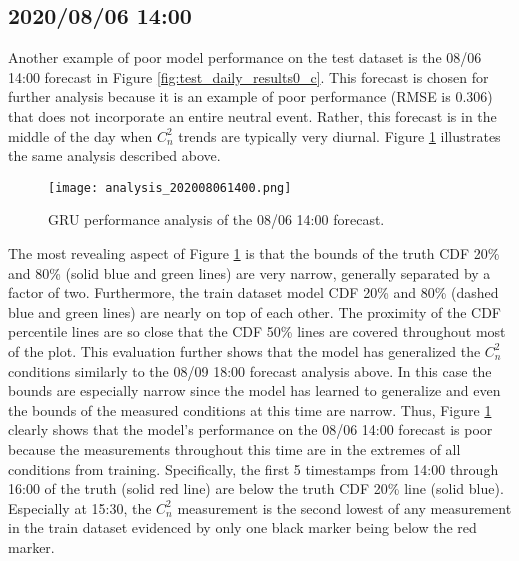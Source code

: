 \subsection{2020/08/06 14:00}
Another example of poor model performance on the test dataset is the 08/06 14:00 forecast in Figure \ref{fig:test_daily_results0_c}. This forecast is chosen for further analysis because it is an example of poor performance (RMSE is 0.306) that does not incorporate an entire neutral event. Rather, this forecast is in the middle of the day when $C_{n}^{2}$ trends are typically very diurnal. Figure \ref{fig:analysis_08061400} illustrates the same analysis described above.
\begin{figure}[h!]
	\centering
	\texttt{[image: analysis\_202008061400.png]}
	\caption{GRU performance analysis of the 08/06 14:00 forecast.}
	\label{fig:analysis_08061400}
\end{figure}
The most revealing aspect of Figure \ref{fig:analysis_08061400} is that the bounds of the truth CDF 20\% and 80\% (solid blue and green lines) are very narrow, generally separated by a factor of two. Furthermore, the train dataset model CDF 20\% and 80\% (dashed blue and green lines) are nearly on top of each other. The proximity of the CDF percentile lines are so close that the CDF 50\% lines are covered throughout most of the plot. This evaluation further shows that the model has generalized the $C_{n}^{2}$ conditions similarly to the 08/09 18:00 forecast analysis above. In this case the bounds are especially narrow since the model has learned to generalize and even the bounds of the measured conditions at this time are narrow. Thus, Figure \ref{fig:analysis_08061400} clearly shows that the model's performance on the 08/06 14:00 forecast is poor because the measurements throughout this time are in the extremes of all conditions from training. Specifically, the first 5 timestamps from 14:00 through 16:00 of the truth (solid red line) are below the truth CDF 20\% line (solid blue). Especially at 15:30, the $C_{n}^{2}$ measurement is the second lowest of any measurement in the train dataset evidenced by only one black marker being below the red marker.


